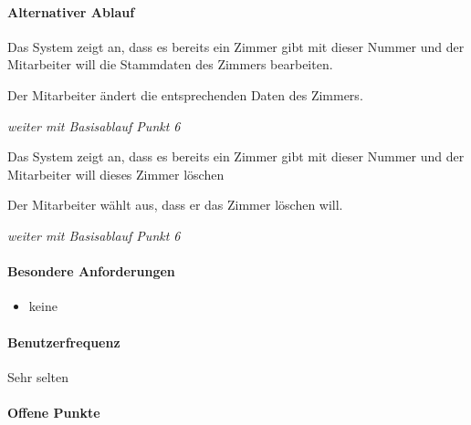 \paragraph{Alternativer Ablauf}
\begin{longenum}
	\item
	\begin{longenum}
		\item Das System zeigt an, dass es bereits ein \Gls{Zimmer} gibt mit dieser Nummer und der \Gls{Mitarbeiter} will die \Gls{Stammdaten} des \Gls{Zimmer}s bearbeiten.
		\begin{longenum}
			\item Der \Gls{Mitarbeiter} ändert die entsprechenden Daten des \Gls{Zimmer}s. 
			\item \emph{weiter mit Basisablauf Punkt 6}
		\end{longenum}
	\end{longenum}
	
	\item
	\item
	\item
	\begin{longenum}
		\item Das System zeigt an, dass es bereits ein \Gls{Zimmer} gibt mit dieser Nummer und der \Gls{Mitarbeiter} will dieses Zimmer löschen
		\begin{longenum}
			\item Der \Gls{Mitarbeiter} wählt aus, dass er das \Gls{Zimmer} löschen will.
			\item \emph{weiter mit Basisablauf Punkt 6}
		\end{longenum}
	\end{longenum}
\end{longenum}

\paragraph{Besondere Anforderungen}
\begin{itemize}
	\item keine
\end{itemize}

\paragraph{Benutzerfrequenz}
Sehr selten

\paragraph{Offene Punkte}

\newpage
